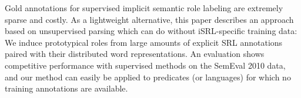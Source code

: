 Gold annotations for supervised implicit semantic role labeling are extremely sparse and costly. As a lightweight alternative, this paper describes an approach based on unsupervised parsing which can do without iSRL-specific training data: We induce prototypical roles from large amounts of explicit SRL annotations paired with their distributed word representations. An evaluation shows competitive performance with supervised methods on the SemEval 2010 data, and our method can easily be applied to predicates (or languages) for which no training annotations are available.
